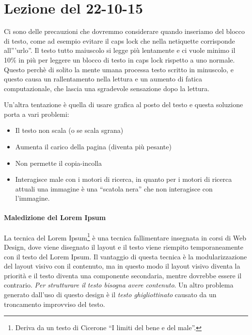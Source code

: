 \section{Lezione del 22-10-15}

Ci sono delle precauzioni che dovremmo considerare quando inseriamo del blocco di testo, come ad esempio evitare il caps lock che nella netiquette corrisponde all'''urlo''. Il testo tutto maiuscolo si legge pi\`u lentamente e ci vuole minimo il 10\% in pi\`u per leggere un blocco di testo in caps lock rispetto a uno normale. Questo perch\`e di solito la mente umana processa testo scritto in minuscolo, e questo causa un rallentamento nella lettura e un aumento di fatica computazionale, che lascia una sgradevole sensazione dopo la lettura.

Un'altra tentazione \`e quella di usare grafica al posto del testo e questa soluzione porta a vari problemi:
\begin{itemize}

\item Il testo non scala (o se scala sgrana)
\item Aumenta il carico della pagina (diventa pi\`u pesante)
\item Non permette il copia-incolla
\item Interagisce male con i motori di ricerca, in quanto per i motori di ricerca attuali una immagine \`e una ``scatola nera'' che non interagisce con l'immagine.

\end{itemize}

\paragraph*{Maledizione del Lorem Ipsum} La tecnica del Lorem Ipsum\footnote{Deriva da un testo di Cicerone ``I limiti del bene e del male''.} \`e una tecnica fallimentare insegnata in corsi di Web Design, dove viene disegnato il layout e il testo viene riempito temporaneamente con il testo del Lorem Ipsum. Il vantaggio di questa tecnica \`e la modularizzazione del layout visivo con il contenuto, ma in questo modo il layout visivo diventa la priorit\`a e il testo diventa una componente secondaria, mentre dovrebbe essere il contrario. \textit{Per strutturare il testo bisogna avere contenuto}. Un altro problema generato dall'uso di questo design \`e il \textit{testo ghigliottinato} causato da un troncamento improvviso del testo.

